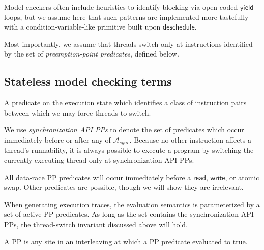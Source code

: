 Model checkers often include heuristics to identify blocking via open-coded $\mathsf{yield}$ loops,
but we assume here that such patterns are implemented more tastefully with a condition-variable-like primitive built upon $\mathsf{deschedule}$.

Most importantly, we assume that threads switch only at instructions identified by the set of {\em preemption-point predicates}, defined below.

\subsection{Stateless model checking terms}

\begin{definition}
	A predicate on the execution state which identifies a class of instruction pairs between which we may force threads to switch.
\end{definition}

We use {\em synchronization API PPs} to denote the set of predicates
which occur immediately before or after any of $\mathcal{A}_{sync}$.
Because no other instruction affects a thread's runnability, it is always possible to execute a program by switching the currently-executing thread only at synchronization API PPs.

All data-race PP predicates will occur immediately before a $\mathsf{read}$, $\mathsf{write}$, or atomic swap.
Other predicates are possible, though we will show they are irrelevant.

When generating execution traces, the evaluation semantics is parameterized by a set of active PP predicates.
As long as the set contains the synchronization API PPs,
the thread-switch invariant discussed above will hold.

\begin{definition}
	A PP is any site in an interleaving at which a PP predicate evaluated to true.
\end{definition}

